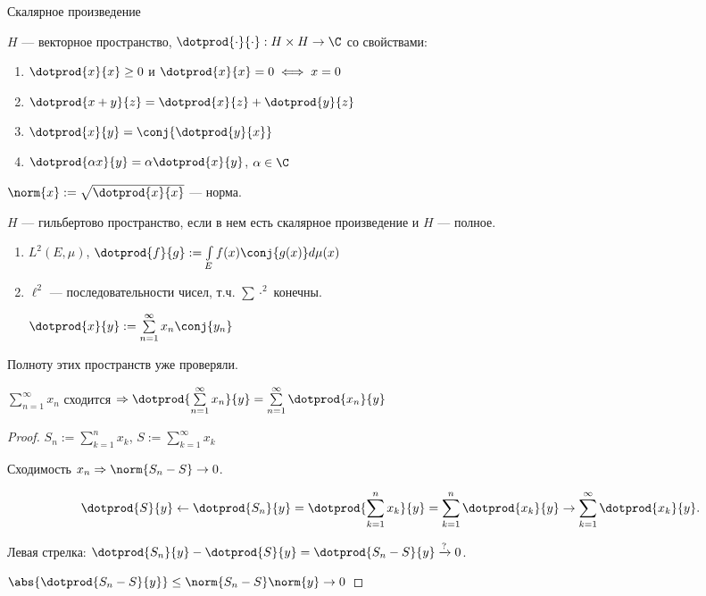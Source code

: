 \begin{definition} Скалярное произведение

    $H$ --- векторное пространство,
    $\dotprod{\cdot}{\cdot}: H \times H \to \C$ со свойствами:
    \begin{enumerate}
        \item $\dotprod{x}{x} \geq 0$ и $\dotprod{x}{x} = 0 \iff x = 0$
        \item $\dotprod{x+y}{z} = \dotprod{x}{z} + \dotprod{y}{z}$
        \item $\dotprod{x}{y} = \conj{\dotprod{y}{x}}$
        \item $\dotprod{\alpha x}{y} = \alpha \dotprod{x}{y}$, $\alpha \in \C$
    \end{enumerate}
\end{definition}

\begin{observation}
    $\norm{x} := \sqrt{\dotprod{x}{x}}$ --- норма.
\end{observation}

\begin{definition}
    $H$ --- гильбертово пространство, если в нем есть скалярное произведение и $H$ --- полное.
\end{definition}

\begin{examples}
    \begin{enumerate}
        \item $L^2(E, \mu)$, $\dotprod{f}{g} := \int\limits_E f(x)\conj{g(x)} d\mu(x)$
        \item $\ell^2$ --- последовательности чисел, т.ч. $\sum \cdot^2$ конечны.

              $\dotprod{x}{y} := \sum \limits_{n=1}^\infty x_n\conj{y_n}$
    \end{enumerate}
    Полноту этих пространств уже проверяли.
\end{examples}

\begin{lemma}
    $\sum\limits_{n=1}^\infty x_n$ сходится $\Rightarrow \dotprod{\sum\limits_{n=1}^\infty x_n}{y} =
        \sum\limits_{n=1}^\infty \dotprod{x_n}{y}$
\end{lemma}
\begin{proof}
    $S_n := \sum\limits_{k=1}^n x_k$, $S := \sum\limits_{k=1}^\infty x_k$

    Сходимость $x_n \Rightarrow \norm{S_n - S} \to 0$.

    \[
        \dotprod{S}{y} \leftarrow \dotprod{S_n}{y} = \dotprod{\sum\limits_{k=1}^n x_k}{y}
        = \sum\limits_{k=1}^n \dotprod{x_k}{y} \rightarrow \sum\limits_{k=1}^\infty \dotprod{x_k}{y}
        .\]

    Левая стрелка: $\dotprod{S_n}{y} - \dotprod{S}{y} = \dotprod{S_n - S}{y} \xrightarrow{?} 0$.

    $\abs{\dotprod{S_n - S}{y}} \leq \norm{S_n - S} \norm{y} \to 0$
\end{proof}

